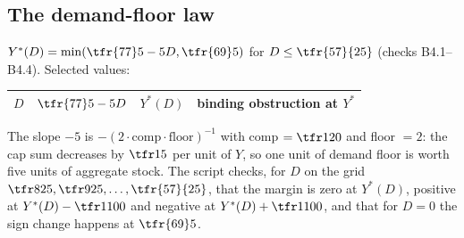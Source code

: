 \subsection{The demand-floor law}
$Y^\ast(D)=\min(\tfr{77}5-5D,\tfr{69}5)$ for $D\le\tfr{57}{25}$ (checks B4.1--B4.4). Selected values:
\begin{center}\footnotesize
\begin{tabular}{cccl}
\toprule
$D$ & $\tfr{77}5-5D$ & $Y^\ast(D)$ & binding obstruction at $Y^\ast$\\
\midrule

\bottomrule
\end{tabular}
\end{center}
The slope $-5$ is $-(2\cdot\text{comp}\cdot\text{floor})^{-1}$ with comp $=\tfr1{20}$ and floor $=2$: the cap sum decreases by $\tfr15$ per unit of $Y$, so one unit of demand floor is worth five units of aggregate stock. The script checks, for $D$ on the grid $\tfr8{25},\tfr9{25},\dots,\tfr{57}{25}$, that the margin is zero at $Y^\ast(D)$, positive at $Y^\ast(D)-\tfr1{100}$ and negative at $Y^\ast(D)+\tfr1{100}$, and that for $D=0$ the sign change happens at $\tfr{69}5$.
